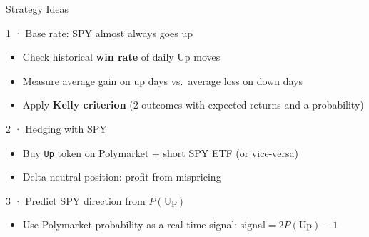 \documentclass[aspectratio=169]{beamer}
\begin{document}
\begin{frame}{Strategy Ideas}

  \begin{block}{1 · Base rate: SPY almost always goes up}
    \begin{itemize}
      \item Check historical \textbf{win rate} of daily Up moves
      \item Measure average gain on up days vs.\ average loss on down days
      \item Apply \textbf{Kelly criterion} (2 outcomes with expected returns and a probability)
    \end{itemize}
  \end{block}

  \begin{block}{2 · Hedging with SPY}
    \begin{itemize}
      \item Buy \texttt{Up} token on Polymarket + short SPY ETF (or vice-versa)
      \item Delta-neutral position: profit from mispricing
    \end{itemize}
  \end{block}

  \begin{block}{3 · Predict SPY direction from $P(\text{Up})$}
    \begin{itemize}
      \item Use Polymarket probability as a real-time signal: $\text{signal} = 2 P(\text{Up}) - 1$
    \end{itemize}
  \end{block}

\end{frame}

\end{document}
